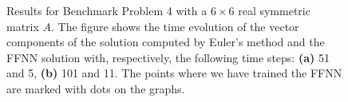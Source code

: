 \begin{figure}[H]
\centering
{}
\qquad
{}
\caption{Results for Benchmark Problem 4 with a $6\times 6$ real symmetric matrix $A$. The figure shows the time evolution of the vector components of the solution computed by Euler's method and the FFNN solution with, respectively, the following time steps: \textbf{(a)} 51 and 5, \textbf{(b)} 101 and 11. The points where we have trained the FFNN are marked with dots on the graphs.}
\label{fig:benchrun4comp1}
\end{figure}

